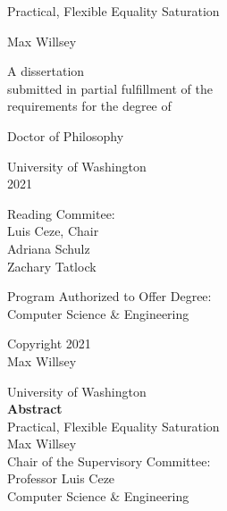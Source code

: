 \documentclass[12pt, oneside]{report}
\title{\mytitle}
\author{\myauthor}
\def\mytitle{Practical, Flexible Equality Saturation}
\def\myauthor{Max Willsey}
\def\year{2021}
\begin{document}
\pagestyle{empty}

\begin{center}
  {\Large \mytitle}
  \vfill

  \myauthor
  \vfill

  \begin{spacing}{1}
    A dissertation \\
    submitted in partial fulfillment of the \\
    requirements for the degree of
  \end{spacing}
  \vfill

  Doctor of Philosophy
  \vfill

  University of Washington \\
  \year
  \vfill

  Reading Commitee: \\
  Luis Ceze, Chair \\
  Adriana Schulz \\
  Zachary Tatlock
  \vfill

  \begin{spacing}{1}
    Program Authorized to Offer Degree: \\
    Computer Science \& Engineering
  \end{spacing}
  \clearpage

  \textcopyright{} Copyright \year\\
  \myauthor
  \clearpage
\end{center}

\pagestyle{plain}

\setcounter{page}{1}

\begin{center}
  University of Washington \\[1em]
  \textbf{Abstract}        \\[1em]
  \mytitle                 \\[1em]
  \myauthor                \\[1em]

  Chair of the Supervisory Committee: \\[-0.5em]
  Professor Luis Ceze                 \\[-0.5em]
  Computer Science \& Engineering
  \\[2em]
\end{center}

\clearpage

\begin{spacing}{1.5}
  \tableofcontents
\end{spacing}
\end{document}
